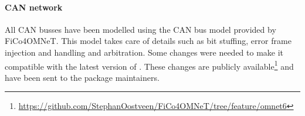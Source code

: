 \paragraph{CAN network} All CAN busses have been modelled using the CAN bus model provided by FiCo4OMNeT. This model takes care of details such as bit stuffing, error frame injection and handling and arbitration. Some changes were needed to make it compatible with the latest version of \omnet. These changes are publicly available\footnote{\url{https://github.com/StephanOostveen/FiCo4OMNeT/tree/feature/omnet6}} and have been sent to the package maintainers. 